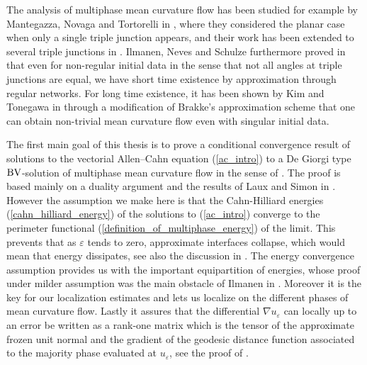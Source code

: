 The analysis of multiphase mean curvature flow has been studied for example by 
Mantegazza, Novaga and Tortorelli in 
\cite{mantegazza_novaga_tortorelli_motion_by_curvature_of_planar_networks}, 
where they considered the planar case when only a single triple junction 
appears, and their work has been extended to several triple junctions in 
\cite{mantegazza_novaga_pluda_schule_evolution_of_networks_with_multiple_junctions}.
Ilmanen, Neves and Schulze furthermore proved in 
\cite{ilmanen_neves_schulze_on_short_time_existence_for_the_planar_network_flow}
that even for non-regular initial data in the sense that not all angles at 
triple junctions are equal, we have short time existence by approximation 
through regular networks. For long time existence, it has been shown by Kim and 
Tonegawa in \cite{kim_tonegawa_on_the_mean_curvature_flow_of_grain_boundaries} 
through a modification of Brakke's approximation scheme that one can obtain 
non-trivial mean curvature flow even with singular initial data.

The first main goal of this thesis is to prove a conditional convergence result 
of solutions to the vectorial Allen--Cahn equation (\ref{ac_intro}) to a De 
Giorgi type $ \operatorname{BV} $-solution of multiphase mean curvature flow in the sense of 
. The proof is based mainly on a duality 
argument and the results of Laux and Simon in 
\cite{convergence_of_allen_cahn_equation_to_multiphase_mean_curvature_flow}.
However the assumption we make here is that the Cahn-Hilliard energies 
(\ref{cahn_hilliard_energy}) of the solutions to (\ref{ac_intro}) converge to 
the perimeter functional (\ref{definition_of_multiphase_energy}) of the limit. 
This prevents that as $ \varepsilon $ tends to zero, approximate interfaces 
collapse, which would mean that energy dissipates, see also the discussion in
. The energy 
convergence assumption provides us with the important equipartition of 
energies, whose proof under milder assumption was the main obstacle of Ilmanen 
in \cite{ilmanen_convergence_of_ac_to_brakkes_mcf}. Moreover it is the key for 
our localization estimates and lets us localize on the different phases of mean 
curvature flow. Lastly it assures that the differential $ \nabla u_{ 
\varepsilon } $ can locally up to an error be written as a rank-one matrix which
is the tensor of the approximate frozen unit normal and the gradient of the 
geodesic 
distance function associated to the majority phase evaluated at $ u_{ 
\varepsilon } $, see the proof of .

